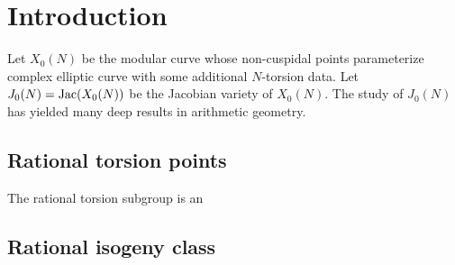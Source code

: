 \chapter{Introduction}%
\label{chap:intro}

Let $X_0(N)$ be the modular curve whose non-cuspidal points parameterize
complex elliptic curve with some additional $N$-torsion data. Let
$J_0(N)=\operatorname{Jac}(X_0(N))$ be the Jacobian variety of $X_0(N)$. The study of
$J_0(N)$ has yielded many deep results in arithmetic geometry.

\section{Rational torsion points}%
\label{sec:rational_torsion_points}

The rational torsion subgroup is an 

\section{Rational isogeny class}%
\label{sec:rational_isogeny_class}


